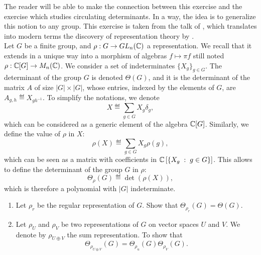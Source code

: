  
\begin{exo}
\label{exo-det-groupe}
 
  \label{notation-95} \label{notation-96} The reader will be able to make the connection between this exercise and the exercise  which studies circulating determinants. In a way, the idea is to generalize this notion to any group. This exercise is taken from the talk of , which translates into modern terms the discovery of representation theory by . \\Let $G$ be a finite group, and $ \rho: G \rightarrow GL_n (\mathbb{C}) $ a representation. We recall that it extends in a unique way into a morphism of algebras $ f \mapsto \pi f $ still noted $ \rho: \mathbb{C} [G] \rightarrow M_n (\mathbb{C}) $. We consider a set of indeterminates $ \{X_g\}_{g \in G} $. The determinant of the group $G$ is denoted $ \Theta (G) $, and it is the determinant of the matrix $ A $ of size $ |G| \times |G| $, whose entries, indexed by the elements of $G$, are $ A_{g, h} \eqdef X_{gh^{-1}} $. To simplify the notations, we denote
\begin{equation*}
X \eqdef \sum_{g \in G}{X_g \delta_g},
\end{equation*}
which can be considered as a generic element of the algebra $ \mathbb{C} [G] $. Similarly, we define the value of $ \rho $ in $ X $:
\begin{equation*}
\rho (X) \eqdef \sum_{g \in G}{X_g \rho (g)},
\end{equation*}
which can be seen as a matrix with coefficients in $ \mathbb{C} \left[\left\{ X_g \;:\; g \in G \right\} \right] $. This allows to define the determinant of the group $G$ in $ \rho $:
\begin{equation*}
\Theta_\rho (G) \eqdef \det (\rho (X)),
\end{equation*}
which is therefore a polynomial with $ |G| $ indeterminate. \begin{enumerate}
\item Let $ \rho_r $ be the regular representation of $G$. Show that $ \Theta_{\rho_r} (G) = \Theta (G) $.
\item {} Let $ \rho_U $ and $ \rho_V $ be two representations of $G$ on vector spaces $ U $ and $V$. We denote by $ \rho_{U \oplus V} $ the sum representation. To show that
\begin{equation*}
\Theta_{\rho_{U \oplus V}} (G) = \Theta_{\rho_u} (G) \Theta_{\rho_V} (G).
\end{equation*}
 

\end{enumerate}
\end{exo}
